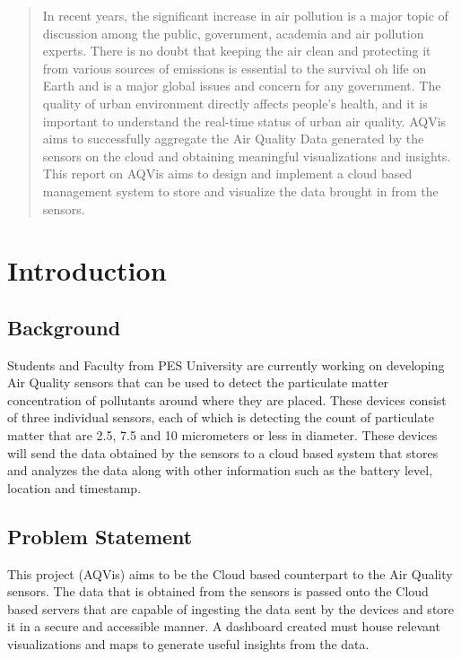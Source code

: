 \documentclass[]{report}
\begin{document}
 

\begin{abstract}
 In recent years, the significant increase in air pollution is a major topic of discussion among the public, government, academia and air pollution experts. There is no doubt that keeping the air clean and protecting it from various sources of emissions is essential to the survival oh life on Earth and is a major global issues and concern for any government. The quality of urban environment directly affects people's health, and it is important to understand the real-time status of urban air quality. AQVis aims to successfully aggregate the Air Quality Data generated by the sensors on the cloud and obtaining meaningful visualizations and insights. This report on AQVis aims to design and implement a cloud based management system to store and visualize the data brought in from the sensors.
\end{abstract}

\tableofcontents
\listoffigures
\listoftables



\chapter{Introduction}

\section{Background}
Students and Faculty from PES University are currently working on developing Air Quality sensors that can be used to detect the particulate matter concentration of pollutants around where they are placed. These devices consist of three individual sensors, each of which is detecting the count of particulate matter that are 2.5, 7.5 and 10 micrometers or less in diameter. These devices will send the data obtained by the sensors to a cloud based system that stores and analyzes the data along with other information such as the battery level, location and timestamp.

\section{Problem Statement}
This project (AQVis) aims to be the Cloud based counterpart to the Air Quality sensors. The data that is obtained from the sensors is passed onto the Cloud based servers that are capable of ingesting the data sent by the devices and store it in a secure and accessible manner. A dashboard created must house relevant visualizations and maps to generate useful insights from the data.
\end{document}
